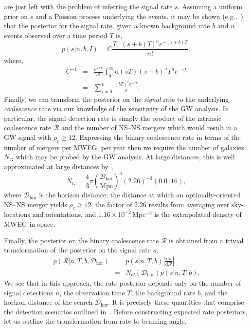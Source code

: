 \documentclass[twocolumn,nofootinbib]{revtex4-1}
\newcommand{\cbcrate}{{{\mathcal R}}}
\newcommand{\diff}{{\mathrm d}}
\newcommand{\dhor}{\ensuremath{{\mathcal D}_{\mathrm{hor}}}}
\newcommand{\mpc}{\mathrm{Mpc}}
\newcommand{\BNS}{\ac{NS}--\ac{NS}\xspace}
\begin{document}
are just left with the problem of inferring the signal rate $s$.
Assuming a uniform prior on $s$ and a Poisson process underlying the
events, it may be shown (e.g.,~\cite{2010blda.book.....G}) that the
posterior for the signal rate, given a known background rate $b$ and
$n$ events observed over a time period $T$ is,
%
\begin{equation}
p(s|n,b,I) = C \frac{ T\left[(s+b)T\right]^n e^{-(s+b)T}}{n!},
\end{equation}
%
where,
\begin{eqnarray}
C^{-1} & = &\frac{e^{-bT}}{n!} \int_0^{\infty}\diff(sT)(s+b)^n T^n e^{-sT}\\
& = & \sum_{i=0}^n \frac{ (bT)^i e^{-bT}}{i!}.
\end{eqnarray}
%
Finally, we can transform the posterior on the \emph{signal} rate to
the underlying \emph{coalescence} rate via our knowledge of the
sensitivity of the \ac{GW} analysis.  In particular, the signal
detection rate is simply the product of the intrinsic coalescence rate
$\cbcrate$ and the number of \BNS mergers which would result in a
\ac{GW} signal with $\rho_c\geq12$.  Expressing the binary coalescence
rate in terms of the number of mergers per \ac{MWEG}, per year then we
require the number of galaxies $N_{\mathrm{G}}$ which may be probed by
the \ac{GW} analysis.  At large distances, this is well approximated
at large distances by~\cite{rates_paper},
%
\begin{equation}
    N_G = \frac{4}{3} \pi \left( \frac{\dhor}{\mpc}
\right)^3 (2.26)^{-3} (0.0116),
\end{equation}
%
where $\dhor$ is the horizon distance; the distance at which an
optimally-oriented \BNS merger yields $\rho_c\geq12$, the factor of
2.26 results from averaging over sky-locations and orientations, and
$1.16\times 10^{-2}$\,Mpc$^{-3}$ is the extrapolated density of
\ac{MWEG} in space.

Finally, the posterior on the binary coalescence rate $\cbcrate$ is obtained from a trivial transformation of the posterior on the signal rate $s$,
%
\begin{eqnarray}
    p(\cbcrate|n,T,b,\dhor) & = & p(s|n,T,b) \left|\frac{\diff s}{\diff \cbcrate}\right| \\
                                   & = & N_G(\dhor)p(s|n,T,b).
\end{eqnarray}
%
We see that in this approach, the rate posterior depends only on the
number of signal detections $n$, the observation time $T$, the
background rate $b$, and the horizon distance of the search $\dhor$.
It is precisely these quantities that comprise the detection scenarios
outlined in~\cite{Aasi:2013wya}.  Before constructing expected rate
posteriors, let us outline the transformation from rate to beaming
angle.
\end{document}
